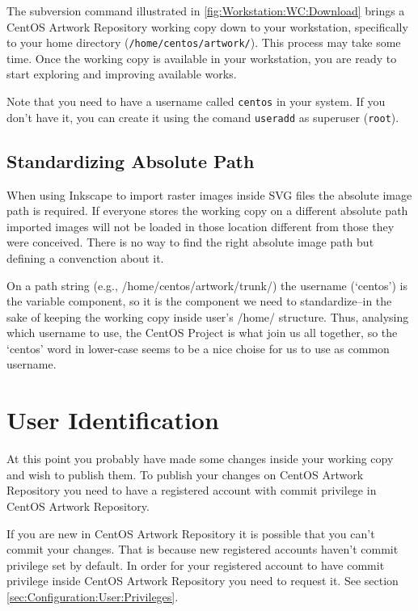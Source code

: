 The subversion command illustrated in
\autoref{fig:Workstation:WC:Download} brings a CentOS Artwork
Repository working copy down to your workstation, specifically to your
home directory (\texttt{/home/centos/artwork/}). This process may take
some time.  Once the working copy is available in your workstation,
you are ready to start exploring and improving available works.

Note that you need to have a username called \texttt{centos} in your
system.  If you don't have it, you can create it using the comand
\texttt{useradd} as superuser (\texttt{root}).

\subsection{Standardizing Absolute Path}

When using Inkscape to import raster images inside SVG files the
absolute image path is required. If everyone stores the working copy
on a different absolute path imported images will not be loaded in
those location different from those they were conceived. There is no
way to find the right absolute image path but defining a convenction
about it. 

On a path string (e.g., /home/centos/artwork/trunk/) the username
(`centos') is the variable component, so it is the component we need
to standardize--in the sake of keeping the working copy inside user's
/home/ structure. Thus, analysing which username to use, the CentOS
Project is what join us all together, so the `centos' word in
lower-case seems to be a nice choise for us to use as common username. 

\section{User Identification}

At this point you probably have made some changes inside your working
copy and wish to publish them.  To publish your changes on CentOS
Artwork Repository you need to have a registered account with commit
privilege in CentOS Artwork Repository.

If you are new in CentOS Artwork Repository it is possible that you
can't commit your changes. That is because new registered accounts
haven't commit privilege set by default.  In order for your registered
account to have commit privilege inside CentOS Artwork Repository you
need to request it. See section
\ref{sec:Configuration:User:Privileges}.

